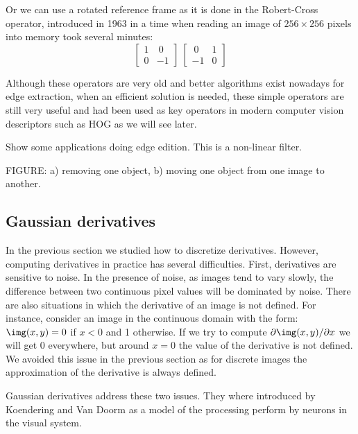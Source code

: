 Or we can use a rotated reference frame as it is done in the Robert-Cross operator, introduced in 1963 \cite{} in a time when reading an image of $256 \times 256$ pixels into memory took several minutes:
\begin{equation}
	\begin{bmatrix}
		1 & ~0 \\
		0 & -1
	\end{bmatrix}
	~
	\begin{bmatrix}
		~0 & 1 \\
		-1 & 0
	\end{bmatrix}
\end{equation}

Although these operators are very old and better algorithms exist nowadays for edge extraction, when an efficient solution is needed, these simple operators are still very useful and had been used as key operators in modern computer vision descriptors such as HOG as we will see later.



Show some applications doing edge edition. This is a non-linear filter.



FIGURE: a) removing one object, b) moving one object from one image to another.

\subsection{Gaussian derivatives}

In the previous section we studied how to discretize derivatives. However, computing derivatives in practice has several difficulties. First, derivatives are sensitive to noise. In the presence of noise, as images tend to vary slowly, the difference between two continuous pixel values will be dominated by noise. There are also situations in which the derivative of an image is not defined. For instance, consider an image in the continuous domain with the form: $\img (x,y) = 0$ if $x<0$ and 1 otherwise. If we try to compute $\partial \img (x,y) / \partial x$ we will get 0 everywhere, but around $x=0$ the value of the derivative is not defined. We avoided this issue in the previous section as for discrete images the approximation of the derivative is always defined.

Gaussian derivatives address these two issues. They where introduced by Koendering and Van Doorm \cite{} as a model of the processing perform by neurons in the visual system.

